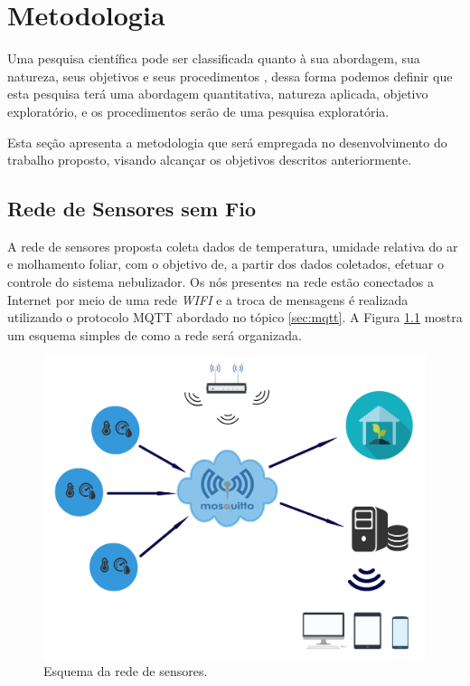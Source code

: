 \chapter{Metodologia}

Uma pesquisa científica pode ser classificada quanto à sua abordagem, sua natureza, seus objetivos e seus procedimentos \cite{gerhardt2009tiposdepesquisa}, dessa forma podemos definir que esta pesquisa terá uma abordagem quantitativa, natureza aplicada, objetivo exploratório, e os procedimentos serão de uma pesquisa exploratória.

Esta seção apresenta a metodologia que será empregada no desenvolvimento do trabalho proposto, visando alcançar os objetivos descritos anteriormente.

\section{Rede de Sensores sem Fio}
A rede de sensores proposta coleta dados de temperatura, umidade relativa do ar e molhamento foliar, com o objetivo de, a partir dos dados coletados, efetuar o controle do sistema nebulizador. Os nós presentes na rede estão conectados a Internet por meio de uma rede \textit{WIFI} e a troca de mensagens é realizada utilizando o protocolo MQTT abordado no tópico \ref{sec:mqtt}. A Figura \ref{fig:esquema-rede} mostra um esquema simples de como a rede será organizada.

\begin{figure}[H]
    \centering
    \includegraphics[scale=0.4]{./04-figuras/rede.png}
    \caption{Esquema da rede de sensores.}
    \vspace{-\baselineskip}
    \label{fig:esquema-rede}
\end{figure}

